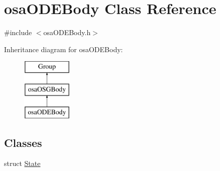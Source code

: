 \hypertarget{classosa_o_d_e_body}{\section{osa\-O\-D\-E\-Body Class Reference}
\label{classosa_o_d_e_body}
}


{\ttfamily \#include $<$osa\-O\-D\-E\-Body.\-h$>$}

Inheritance diagram for osa\-O\-D\-E\-Body\-:\begin{figure}[H]
\begin{center}
\leavevmode
\includegraphics[height=3.000000cm]{dc/d68/classosa_o_d_e_body}
\end{center}
\end{figure}
\subsection*{Classes}
\begin{DoxyCompactItemize}
\item 
struct \hyperlink{structosa_o_d_e_body_1_1_state}{State}
\end{DoxyCompactItemize}
